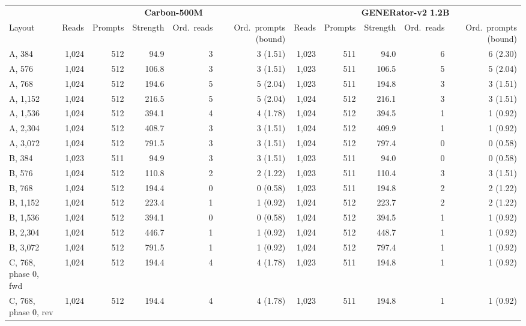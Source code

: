 \begin{tabular}{@{}l rrrrr@{\hspace{4pt}}rrrrr@{}}
\toprule
& \multicolumn{5}{c}{\textbf{Carbon-500M}} & \multicolumn{5}{c}{\textbf{GENERator-v2 1.2B}} \\
\cmidrule(lr){2-6}\cmidrule(l){7-11}
Layout & Reads & Prompts & Strength & Ord.\ reads & Ord.\ prompts (bound) & Reads & Prompts & Strength & Ord.\ reads & Ord.\ prompts (bound) \\
\midrule
A, 384 & 1{,}024 & 512 & 94.9 & 3 & 3 (1.51) & 1{,}023 & 511 & 94.0 & 6 & 6 (2.30) \\
A, 576 & 1{,}024 & 512 & 106.8 & 3 & 3 (1.51) & 1{,}023 & 511 & 106.5 & 5 & 5 (2.04) \\
A, 768 & 1{,}024 & 512 & 194.6 & 5 & 5 (2.04) & 1{,}023 & 511 & 194.8 & 3 & 3 (1.51) \\
A, 1{,}152 & 1{,}024 & 512 & 216.5 & 5 & 5 (2.04) & 1{,}024 & 512 & 216.1 & 3 & 3 (1.51) \\
A, 1{,}536 & 1{,}024 & 512 & 394.1 & 4 & 4 (1.78) & 1{,}024 & 512 & 394.5 & 1 & 1 (0.92) \\
A, 2{,}304 & 1{,}024 & 512 & 408.7 & 3 & 3 (1.51) & 1{,}024 & 512 & 409.9 & 1 & 1 (0.92) \\
A, 3{,}072 & 1{,}024 & 512 & 791.5 & 3 & 3 (1.51) & 1{,}024 & 512 & 797.4 & 0 & 0 (0.58) \\
\midrule
B, 384 & 1{,}023 & 511 & 94.9 & 3 & 3 (1.51) & 1{,}023 & 511 & 94.0 & 0 & 0 (0.58) \\
B, 576 & 1{,}024 & 512 & 110.8 & 2 & 2 (1.22) & 1{,}023 & 511 & 110.4 & 3 & 3 (1.51) \\
B, 768 & 1{,}024 & 512 & 194.4 & 0 & 0 (0.58) & 1{,}023 & 511 & 194.8 & 2 & 2 (1.22) \\
B, 1{,}152 & 1{,}024 & 512 & 223.4 & 1 & 1 (0.92) & 1{,}024 & 512 & 223.7 & 2 & 2 (1.22) \\
B, 1{,}536 & 1{,}024 & 512 & 394.1 & 0 & 0 (0.58) & 1{,}024 & 512 & 394.5 & 1 & 1 (0.92) \\
B, 2{,}304 & 1{,}024 & 512 & 446.7 & 1 & 1 (0.92) & 1{,}024 & 512 & 448.7 & 1 & 1 (0.92) \\
B, 3{,}072 & 1{,}024 & 512 & 791.5 & 1 & 1 (0.92) & 1{,}024 & 512 & 797.4 & 1 & 1 (0.92) \\
\midrule
C, 768, phase 0, fwd & 1{,}024 & 512 & 194.4 & 4 & 4 (1.78) & 1{,}023 & 511 & 194.8 & 1 & 1 (0.92) \\
C, 768, phase 0, rev & 1{,}024 & 512 & 194.4 & 4 & 4 (1.78) & 1{,}023 & 511 & 194.8 & 1 & 1 (0.92) \\

\end{tabular}

